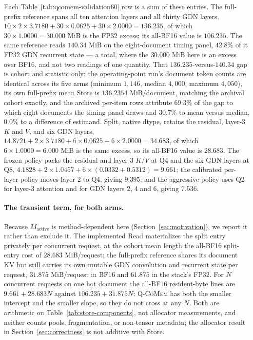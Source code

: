 \documentclass{article}
\newcommand{\qcomem}{\textsc{Q-CoMem}}
\begin{document}
Each Table~\ref{tab:qcomem-validation60} row is a sum of these entries.  The
full-prefix reference spans all ten attention layers and all thirty GDN layers,
$10\times2\times3.7180+30\times0.0625+30\times2.0000=136.235$, of which
$30\times1.0000=30.000$ MiB is the FP32 excess; its all-BF16 value is
$106.235$.  The same reference reads $140.34$ MiB on the eight-document timing
panel, $42.8\%$ of it FP32 GDN recurrent state --- a total, where the $30.000$
MiB here is an excess over BF16, and not two readings of one quantity.  That
$136.235$-versus-$140.34$ gap is cohort and statistic only: the operating-point
run's document token counts are identical across its five arms (minimum
$1{,}146$, median $4{,}000$, maximum $4{,}050$), its own full-prefix mean Store
is $136.2354$ MiB/document, matching the archival cohort exactly, and the
archived per-item rows attribute $69.3\%$ of the gap to which eight documents the
timing panel draws and $30.7\%$ to mean versus median, $0.0\%$ to a difference of
estimand.  Split, native dtype, retains the residual, layer-3 $K$ and $V$, and six GDN
layers, $14.8721+2\times3.7180+6\times0.0625+6\times2.0000=34.683$, of which
$6\times1.0000=6.000$ MiB is the same excess, so its all-BF16 value is
$28.683$.  The frozen policy packs the residual and layer-3 $K/V$ at Q4 and the
six GDN layers at Q8, $4.1828+2\times1.0457+6\times(0.0332+0.5312)=9.661$; the
calibrated per-layer policy moves layer 2 to Q4, giving $9.395$; and the aggressive
policy uses Q2 for layer-3 attention and for GDN layers 2, 4 and 6, giving
$7.536$.

\paragraph{The transient term, for both arms.}
Because $M_{\mathrm{active}}$ is method-dependent here
(Section~\ref{sec:motivation}), we report it rather than exclude it.  The
implemented Read materializes the split entry privately per concurrent request,
at the cohort mean length the all-BF16 split-entry cost of $28.683$ MiB/request;
the full-prefix reference shares its document KV but still carries its own
mutable GDN convolution and recurrent state per request, $31.875$ MiB/request in
BF16 and $61.875$ in the stack's FP32.  For $N$ concurrent requests on one hot
document the all-BF16 resident-byte lines are $9.661+28.683N$ against
$106.235+31.875N$: \qcomem{} has both the smaller intercept and the smaller
slope, so they do not cross at any $N$.  Both are arithmetic on
Table~\ref{tab:store-components}, not allocator measurements, and neither counts
pools, fragmentation, or non-tensor metadata; the allocator result in
Section~\ref{sec:correctness} is not additive with Store.
\end{document}
